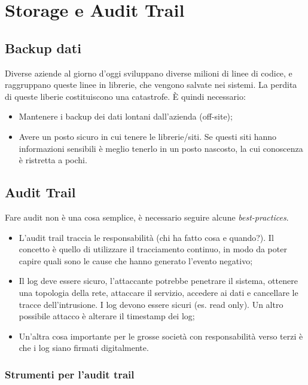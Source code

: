 \section{Storage e Audit Trail}
\label{sat}

\subsection{Backup dati}

Diverse aziende al giorno d'oggi sviluppano diverse milioni di linee di codice,
e raggruppano queste linee in librerie, che vengono salvate nei sistemi. La
perdita di queste liberie costituiscono una catastrofe. È quindi necessario:
\begin{itemize}
 \item Mantenere i backup dei dati lontani dall'azienda (off-site);
 \item Avere un posto sicuro in cui tenere le librerie/siti. Se questi siti
 hanno informazioni sensibili è meglio tenerlo in un posto nascosto, la cui
 conoscenza è ristretta a pochi.
\end{itemize}

\subsection{Audit Trail}

Fare audit non è una cosa semplice, è necessario seguire alcune
\textit{best-practices}.

\begin{itemize}
 \item L'audit trail traccia le responsabilità (chi ha fatto cosa e quando?).
 Il concetto è quello di utilizzare il tracciamento continuo, in modo da poter
 capire quali sono le cause che hanno generato l'evento negativo;
 \item Il log deve essere sicuro, l'attaccante potrebbe penetrare il sistema,
 ottenere una topologia della rete, attaccare il servizio, accedere ai dati e
 cancellare le tracce dell'intrusione. I log devono essere sicuri (es. read
 only). Un altro possibile attacco è alterare il timestamp dei log;
 \item Un'altra cosa importante per le grosse società con responsabilità verso
 terzi è che i log siano firmati digitalmente.

\end{itemize}

\subsubsection{Strumenti per l'audit trail}

